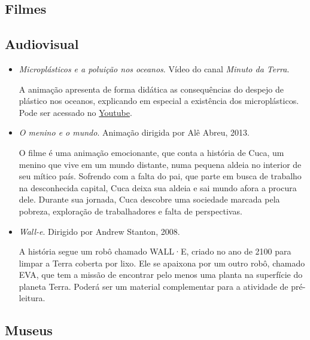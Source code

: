 \documentclass[11pt]{extarticle}
\begin{document}
\subsection{Filmes}

\subsection{Audiovisual}

\begin{itemize}

\item \textit{Microplásticos e a poluição nos oceanos}. Vídeo do canal \textit{Minuto da Terra}. 

A animação apresenta de forma didática as consequências do despejo de plástico nos oceanos, explicando em especial a existência dos microplásticos. Pode ser acessado no \href{https://youtu.be/adc0cOqE4qs}{Youtube}. 

\item \textit{O menino e o mundo}. Animação dirigida por Alê Abreu, 2013.

O filme é uma animação emocionante, que conta a história de Cuca, um menino que vive em um mundo distante, numa pequena aldeia no interior de seu mítico país. Sofrendo com a falta do pai, que parte em busca de trabalho na desconhecida capital, Cuca deixa sua aldeia e sai mundo afora a procura dele. Durante sua jornada, Cuca descobre uma sociedade marcada pela pobreza, exploração de trabalhadores e falta de perspectivas.

\item \textit{Wall-e}. Dirigido por Andrew Stanton, 2008.

A história segue um robô chamado WALL·E, criado no ano de 2100 para limpar a Terra coberta por lixo. Ele se apaixona por um outro robô, chamado EVA, que tem a missão de encontrar pelo menos uma planta na superfície do planeta Terra. Poderá ser um material complementar para a atividade de pré-leitura.

\end{itemize}

\subsection{Museus}
\end{document}
